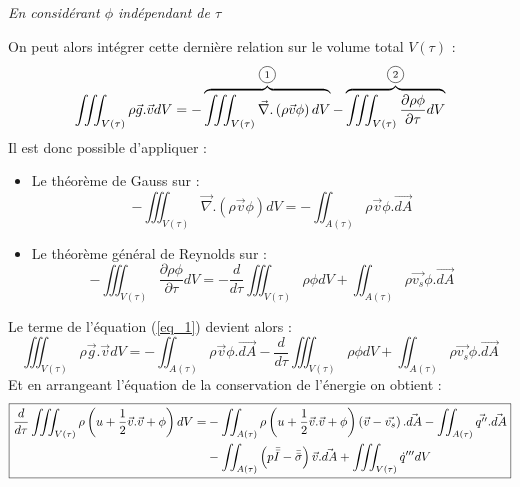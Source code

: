 \emph{En considérant $\phi$ indépendant de $\tau$}\\ \par
On peut alors intégrer cette dernière relation sur le volume total $V(\tau)$ :
\begin{equation}
    \iiint_{V(\tau)} \rho \vec{g}.\vec{v} dV = -\overbrace{\iiint_{V(\tau)} \vec{\nabla}.\left(\rho \vec{v} \phi \right)dV}^{\text{\circled{1}}} - \overbrace{\iiint_{V(\tau)} \frac{\partial \rho \phi}{\partial \tau} dV}^{\text{\circled{2}}}
    \label{eq_1}
\end{equation}
Il est donc possible d'appliquer :
\begin{itemize}
\item Le théorème de Gauss sur  :
\begin{equation}
    - \iiint_{V(\tau)} \vec{\nabla}.\left(\rho \vec{v} \phi \right)dV = - \iint_{A(\tau)} \rho \vec{v} \phi .\vec{dA}
\end{equation}
\item Le théorème général de Reynolds sur  :
\begin{equation}
    -\iiint_{V(\tau)} \frac{\partial \rho \phi}{\partial \tau} dV = -\frac{d}{d\tau}\iiint_{V(\tau)} \rho \phi dV + \iint_{A(\tau)} \rho \vec{v_s} \phi .\vec{dA}
\end{equation}
\end{itemize}
Le terme de l'équation (\ref{eq_1}) devient alors :
\begin{equation}
    \iiint_{V(\tau)} \rho \vec{g}.\vec{v} dV = - \iint_{A(\tau)} \rho \vec{v} \phi .\vec{dA} -\frac{d}{d\tau}\iiint_{V(\tau)} \rho \phi dV + \iint_{A(\tau)} \rho \vec{v_s} \phi .\vec{dA}
\end{equation}
Et en arrangeant l'équation de la conservation de l'énergie on obtient :
\begin{equation}
\boxed{
\begin{split}
    \frac{d}{d\tau}\iiint_{V(\tau)} \rho \left(u+\frac{1}{2} \vec{v}.\vec{v}+ \phi \right) dV = &-\iint_{A(\tau)} \rho \left(u+\frac{1}{2} \vec{v}.\vec{v} + \phi \right) \left(\Vec{v}-\Vec{v_s} \right).\vec{dA} - \iint_{A(\tau)} \vec{q''} .\vec{dA}\\ &- \iint_{A(\tau)} \left(p\bar{\bar{I}} - \bar{\bar{\sigma}}  \right)\vec{v}. \vec{dA} + \iiint_{V(\tau)}\dot{q}''' dV
\end{split}
}
\end{equation}

